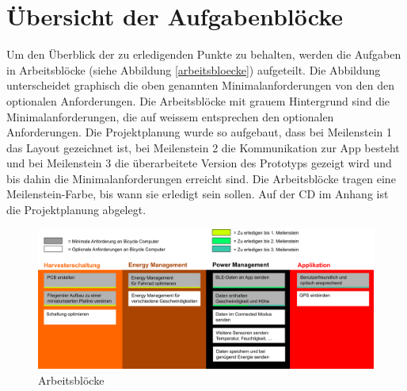 \section{Übersicht der Aufgabenblöcke}

Um den Überblick der zu erledigenden Punkte zu behalten, werden die Aufgaben in Arbeitsblöcke (siehe Abbildung \ref{arbeitsbloecke}) aufgeteilt. Die Abbildung unterscheidet graphisch die oben genannten Minimalanforderungen von den den optionalen Anforderungen. Die Arbeitsblöcke mit grauem Hintergrund sind die Minimalanforderungen, die auf weissem entsprechen den optionalen Anforderungen. Die Projektplanung wurde so aufgebaut, dass bei Meilenstein 1 das Layout gezeichnet ist, bei Meilenstein 2 die Kommunikation zur App besteht und bei Meilenstein 3 die überarbeitete Version des Prototyps gezeigt wird und bis dahin die Minimalanforderungen erreicht sind. Die Arbeitsblöcke tragen eine Meilenstein-Farbe, bis wann sie erledigt sein sollen. Auf der CD im Anhang ist die Projektplanung abgelegt.


\begin{figure}[ht]
    \includegraphics[width=1.0\textwidth]{1Einleitung/Arbeitsbloecke.png} 
    \caption{Arbeitsblöcke}
\end{figure}\label{arbeitsbloecke} 
